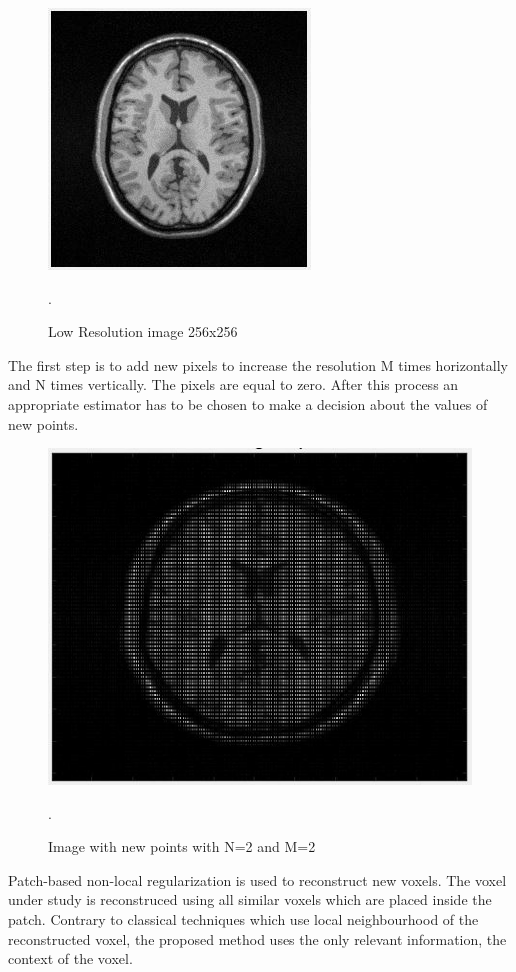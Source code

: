 \begin{figure}[H]
\centering{}\includegraphics[scale=0.7]{figures/Module_10/Module10_2}\caption{Low Resolution image 256x256}. 
\label{fig: Module9_2}
\end{figure}

The first step is to add new pixels to increase the resolution M times horizontally and N times vertically. The pixels are equal to zero. After this process an appropriate estimator has to be chosen to make a decision about the values of new points.

\begin{figure}[H]
\centering{}\includegraphics[scale=0.5]{figures/Module_10/Module10_3}\caption{Image with new points with N=2 and M=2}. 
\label{fig: Module9_3}
\end{figure}

Patch-based non-local regularization is used to reconstruct new voxels. The voxel under study is reconstruced using all similar voxels which are placed inside the patch. Contrary to classical techniques which use local neighbourhood of the reconstructed voxel, the proposed method uses the only relevant information, the context of the voxel.

